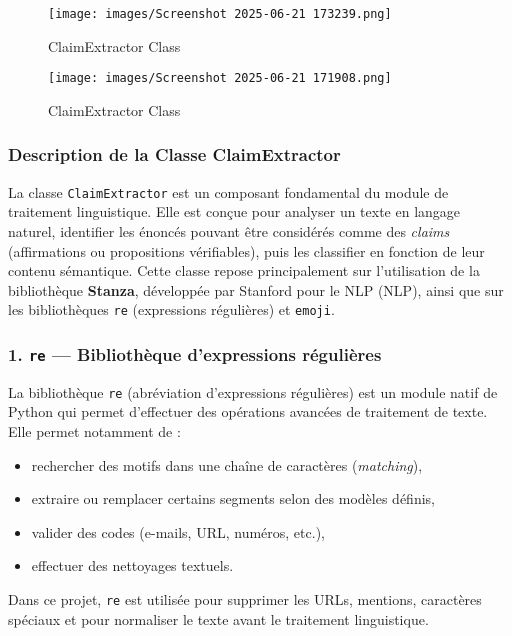 \begin{description}
\begin{description}
\begin{description}
\begin{itemize}
\begin{figure}
\end{figure}

\begin{figure}
    \centering
    \texttt{[image: images/Screenshot 2025-06-21 173239.png]} 
    \caption{ClaimExtractor Class} %
    \label{fig:logos} %
\end{figure}
\newpage

\begin{figure}
  
    \texttt{[image: images/Screenshot 2025-06-21 171908.png]} 
    \caption{ClaimExtractor Class} %
    \label{fig:logos} %
\end{figure}
\vspace{-0.5cm}
\subsubsection{ Description de la Classe ClaimExtractor}
 La classe \texttt{ClaimExtractor} est un composant fondamental du module de traitement linguistique. Elle est conçue pour analyser un texte en langage naturel, identifier les énoncés pouvant être considérés comme des \textit{claims} (affirmations ou propositions vérifiables), puis les classifier en fonction de leur contenu sémantique. Cette classe repose principalement sur l'utilisation de la bibliothèque \textbf{Stanza}, développée par Stanford pour le NLP (NLP), ainsi que sur les bibliothèques \texttt{re} (expressions régulières) et \texttt{emoji}.
 \newline
\subsubsection*{\textbullet{} 1. \texttt{re} --- Bibliothèque d'expressions régulières}
La bibliothèque \texttt{re} (abréviation d'expressions régulières) est un module natif de Python qui permet d'effectuer des opérations avancées de traitement de texte. Elle permet notamment de :
\begin{itemize}
    \item rechercher des motifs dans une chaîne de caractères (\textit{matching}),
    \item extraire ou remplacer certains segments selon des modèles définis,
    \item valider des codes (e-mails, URL, numéros, etc.),
    \item effectuer des nettoyages textuels.
\end{itemize}
Dans ce projet, \texttt{re} est utilisée pour supprimer les URLs, mentions, caractères spéciaux et pour normaliser le texte avant le traitement linguistique.


\end{itemize}
\end{description}
\end{description}
\end{description}
